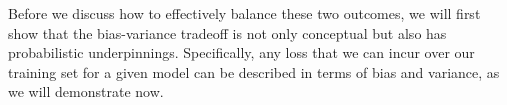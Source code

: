 
Before we discuss how to effectively balance these two outcomes, we will first show that the bias-variance tradeoff is not only conceptual but also has probabilistic underpinnings. Specifically, any loss that we can incur over our training set for a given model can be described in terms of bias and variance, as we will demonstrate now.

